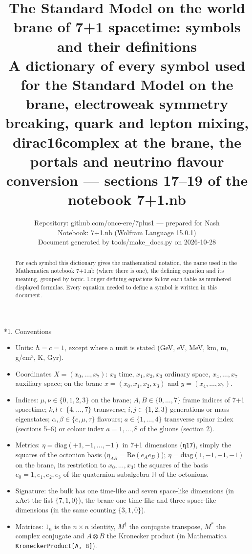 \documentclass[10pt,a4paper]{article}
\makeatletter
\renewcommand\section{\@startsection{section}{1}{\z@}{-3.5ex \@plus -1ex \@minus -.2ex}{2.3ex \@plus.2ex}{\normalfont\Large\bfseries\raggedright}}
\makeatother
\begin{document}
\title{The Standard Model on the world brane of 7+1 spacetime: symbols and their definitions\\[0.4em]\large A dictionary of every symbol used for the Standard Model on the brane, electroweak symmetry breaking, quark and lepton mixing, dirac16complex at the brane, the portals and neutrino flavour conversion — sections 17–19 of the notebook 7+1.nb}
\author{Repository: github.com/once-ere/7plus1 — prepared for Nash\\ Notebook: 7+1.nb (Wolfram Language 15.0.1)\\ Document generated by tools/make\_docs.py on 2026-10-28}
\date{}
\maketitle
\begin{abstract}
For each symbol this dictionary gives the mathematical notation, the name used in the Mathematica notebook 7+1.nb (where there is one), the defining equation and its meaning, grouped by topic. Longer defining equations follow each table as numbered displayed formulas. Every equation needed to define a symbol is written in this document.
\end{abstract}
\tableofcontents
{}\section*{1. Conventions}
\begin{itemize}
\item Units: $\hbar=c=1$, except where a unit is stated (GeV, eV, MeV, km, m, g/cm³, K, Gyr).
\item Coordinates $X=(x_0,\dots,x_7)$: $x_0$ time, $x_1,x_2,x_3$ ordinary space, $x_4,\dots,x_7$ auxiliary space; on the brane $x=(x_0,x_1,x_2,x_3)$ and $y=(x_4,\dots,x_7)$.
\item Indices: $\mu,\nu\in\lbrace0,1,2,3\rbrace$ on the brane; $A,B\in\lbrace0,\dots,7\rbrace$ frame indices of 7+1 spacetime; $k,l\in\lbrace4,\dots,7\rbrace$ transverse; $i,j\in\lbrace1,2,3\rbrace$ generations or mass eigenstates; $\alpha,\beta\in\lbrace e,\mu,\tau\rbrace$ flavours; $a\in\lbrace1,\dots,4\rbrace$ transverse spinor index (sections 5–6) or colour index $a=1,\dots,8$ of the gluons (section 2).
\item Metrics: $\eta=\mathrm{diag}(+1,-1,\dots,-1)$ in 7+1 dimensions (\texttt{η17}), simply the squares of the octonion basis ($\eta_{AB}=\mathrm{Re}(e_Ae_B)$); $\eta=\mathrm{diag}(1,-1,-1,-1)$ on the brane, its restriction to $x_0,\dots,x_3$: the squares of the basis $e_0=1,e_1,e_2,e_3$ of the quaternion subalgebra $\mathbb H$ of the octonions.
\item Signature: the bulk has one time-like and seven space-like dimensions (in xAct the list $\{7,1,0\}$), the brane one time-like and three space-like dimensions (in the same counting $\{3,1,0\}$).
\item Matrices: $1_n$ is the $n\times n$ identity, $M^\dagger$ the conjugate transpose, $M^*$ the complex conjugate and $A\otimes B$ the Kronecker product (in Mathematica \texttt{KroneckerProduct[A, B]}).
\end{itemize}
\end{document}
